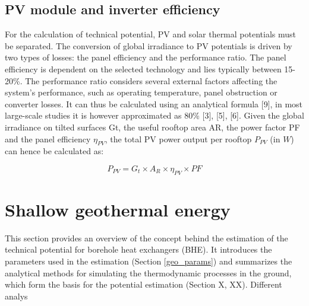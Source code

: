 \subsection{PV module and inverter efficiency}

For the calculation of technical potential, PV and solar thermal potentials must be separated. The conversion of global irradiance to PV potentials is driven by two types of losses: the panel efficiency and the performance ratio. The panel efficiency is dependent on the selected technology and lies typically between 15-20\%. The performance ratio considers several external factors affecting the system’s performance, such as operating temperature, panel obstruction or converter losses. It can thus be calculated using an analytical formula [9], in most large-scale studies it is however approximated as 80\% [3], [5], [6]. Given the global irradiance on tilted surfaces Gt, the useful rooftop area AR, the power factor PF and the panel efficiency $\eta_{PV}$, the total PV power output per rooftop $P_{PV}$ (in $W$) can hence be calculated as:

\begin{equation}
    P_{PV} = G_t \times A_R \times \eta_{PV} \times PF 
\end{equation}

\begin{comment}
\subsection{Solar thermal heat generation}

The computation of the technical potential of a solar thermal collector is more complex to compute, as the solar thermal collector is typically coupled with a heat pump and a hot water tank. In the thermal application, the temperature of the collector and the ambience also play a larger role. Some studies still consider a constant efficiency value [27], while several studies suggest to consider temperature and incident irradiance [11], [28], [29].
\end{comment}

\section{Shallow geothermal energy}
\label{geo_method}

This section provides an overview of the concept behind the estimation of the technical potential for borehole heat exchangers (BHE). It introduces the parameters used in the estimation (Section \ref{geo_params}) and summarizes the analytical methods for simulating the thermodynamic processes in the ground, which form the basis for the potential estimation (Section X, XX). Different analys

